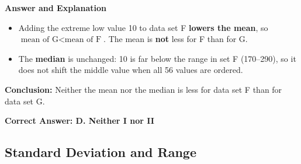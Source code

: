 \documentclass{beamer}
\begin{document}
\begin{frame}{\textbf{Answer and Explanation}}
\begin{itemize}
    \item Adding the extreme low value 10 to data set F \textbf{lowers the mean}, so $\text{mean of G} < \text{mean of F}$. The mean is \textbf{not} less for F than for G.
    \item The \textbf{median} is unchanged: 10 is far below the range in set F (170–290), so it does not shift the middle value when all 56 values are ordered.
\end{itemize}

\textbf{Conclusion:} Neither the mean nor the median is less for data set F than for data set G.

\textbf{Correct Answer: D. Neither I nor II}
\end{frame}









\begin{frame}
\section{ Standard Deviation and Range}
\end{frame}
\end{document}

